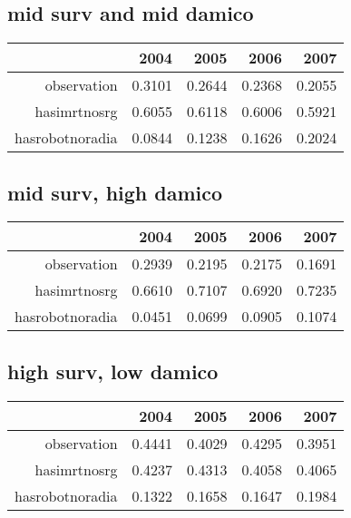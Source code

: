 \documentclass[12pt]{report}
\begin{document}
\subsection{mid surv and mid damico}
\begin{table}[ht]
\begin{center}
\begin{tabular}{rrrrr}
  \hline
 & 2004 & 2005 & 2006 & 2007 \\ 
  \hline
observation & 0.3101 & 0.2644 & 0.2368 & 0.2055 \\ 
  hasimrtnosrg & 0.6055 & 0.6118 & 0.6006 & 0.5921 \\ 
  hasrobotnoradia & 0.0844 & 0.1238 & 0.1626 & 0.2024 \\ 
   \hline
\end{tabular}
\end{center}
\end{table}
\subsection{mid surv, high damico}
\begin{table}[ht]
\begin{center}
\begin{tabular}{rrrrr}
  \hline
 & 2004 & 2005 & 2006 & 2007 \\ 
  \hline
observation & 0.2939 & 0.2195 & 0.2175 & 0.1691 \\ 
  hasimrtnosrg & 0.6610 & 0.7107 & 0.6920 & 0.7235 \\ 
  hasrobotnoradia & 0.0451 & 0.0699 & 0.0905 & 0.1074 \\ 
   \hline
\end{tabular}
\end{center}
\end{table}
\pagebreak
\subsection{high surv, low damico}
\begin{table}[ht]
\begin{center}
\begin{tabular}{rrrrr}
  \hline
 & 2004 & 2005 & 2006 & 2007 \\ 
  \hline
observation & 0.4441 & 0.4029 & 0.4295 & 0.3951 \\ 
  hasimrtnosrg & 0.4237 & 0.4313 & 0.4058 & 0.4065 \\ 
  hasrobotnoradia & 0.1322 & 0.1658 & 0.1647 & 0.1984 \\ 
   \hline
\end{tabular}
\end{center}
\end{table}
\end{document}

